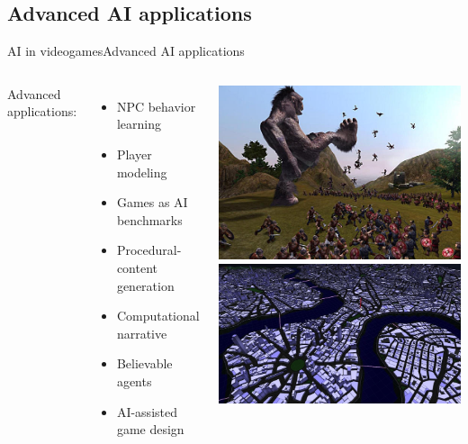 \documentclass[10pt,compress]{beamer} %
\begin{document}
\subsection{Advanced AI applications}
\begin{frame}{AI in videogames}{Advanced AI applications}
    \begin{columns}
	\vspace{-0.5cm}
	   Advanced applications:
	   \begin{itemize}
			\item NPC behavior learning
			\item Player modeling
			\item Games as AI benchmarks
			\item Procedural-content generation
			\item Computational narrative
			\item Believable agents
			\item AI-assisted game design
		\end{itemize}

	\includegraphics[width=0.8\linewidth]{figs/bw}\\
	\includegraphics[width=0.8\linewidth]{figs/procedural}
	\end{columns}
\end{frame}
\end{document}
